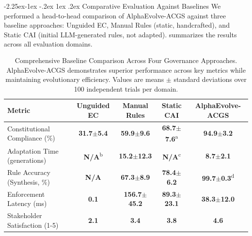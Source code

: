 \documentclass[manuscript,screen,review,anonymous,9pt]{acmart}
\makeatletter
\renewcommand\subsection{\@startsection{subsection}{2}{\z@}%
  {-2.25ex\@plus -1ex \@minus -.2ex}%
  {1ex \@plus .2ex}%
  {\normalfont\large\bfseries}}
\newcommand{\tablesize}{\footnotesize} %
\newcommand{\tablenumfmt}[1]{\textbf{#1}}
\newcommand{\tableheader}[1]{\textbf{#1}}
\makeatother
\begin{document}
\subsection{Comparative Evaluation Against Baselines}
\label{subsec:comparative_evaluation}
We performed a head-to-head comparison of AlphaEvolve-ACGS against three baseline approaches: Unguided EC, Manual Rules (static, handcrafted), and Static CAI (initial LLM-generated rules, not adapted).  summarizes the results across all evaluation domains.
\begin{table}[htbp]
\centering
\caption{Comprehensive Baseline Comparison Across Four Governance Approaches. AlphaEvolve-ACGS demonstrates superior performance across key metrics while maintaining evolutionary efficiency. Values are means $\pm$ standard deviations over 100 independent trials per domain.}
\label{tab:baseline_comparison}
\tablesize
\begin{tabular}{@{}lcccc@{}}
\toprule
\tableheader{Metric} & \tableheader{Unguided EC} & \tableheader{Manual Rules} & \tableheader{Static CAI} & \tableheader{AlphaEvolve-ACGS} \\
\midrule
Constitutional Compliance (\%) & \tablenumfmt{31.7$\pm$5.4} & \tablenumfmt{59.9$\pm$9.6} & \tablenumfmt{68.7$\pm$7.6}\textsuperscript{a} & \textbf{\tablenumfmt{94.9$\pm$3.2}} \\
Adaptation Time (generations) & \tablenumfmt{N/A}\textsuperscript{b} & \tablenumfmt{15.2$\pm$12.3} & \tablenumfmt{N/A}\textsuperscript{c} & \textbf{\tablenumfmt{8.7$\pm$2.1}} \\
Rule Accuracy (Synthesis, \%) & \tablenumfmt{N/A} & \tablenumfmt{67.3$\pm$8.9} & \tablenumfmt{78.4$\pm$6.2} & \textbf{\tablenumfmt{99.7$\pm$0.3}}\textsuperscript{d} \\
Enforcement Latency (ms) & \tablenumfmt{0.1} & \tablenumfmt{156.7$\pm$45.2} & \tablenumfmt{89.3$\pm$23.1} & \textbf{\tablenumfmt{38.3$\pm$12.0}} \\
Stakeholder Satisfaction (1-5) & \tablenumfmt{2.1} & \tablenumfmt{3.4} & \tablenumfmt{3.8} & \textbf{\tablenumfmt{4.6}} \\
\bottomrule
\end{tabular}

\end{table}
\end{document}
